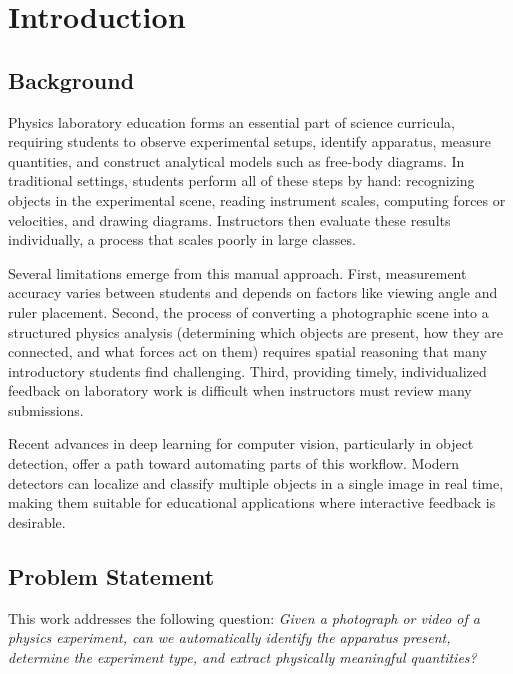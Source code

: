 \documentclass[12pt]{article}
\begin{document}
\newpage
\section{Introduction}

\subsection{Background}

Physics laboratory education forms an essential part of science curricula, requiring students to observe experimental setups, identify apparatus, measure quantities, and construct analytical models such as free-body diagrams. In traditional settings, students perform all of these steps by hand: recognizing objects in the experimental scene, reading instrument scales, computing forces or velocities, and drawing diagrams. Instructors then evaluate these results individually, a process that scales poorly in large classes.

Several limitations emerge from this manual approach. First, measurement accuracy varies between students and depends on factors like viewing angle and ruler placement. Second, the process of converting a photographic scene into a structured physics analysis (determining which objects are present, how they are connected, and what forces act on them) requires spatial reasoning that many introductory students find challenging. Third, providing timely, individualized feedback on laboratory work is difficult when instructors must review many submissions.

Recent advances in deep learning for computer vision, particularly in object detection, offer a path toward automating parts of this workflow. Modern detectors can localize and classify multiple objects in a single image in real time, making them suitable for educational applications where interactive feedback is desirable.

\subsection{Problem Statement}

This work addresses the following question: \textit{Given a photograph or video of a physics experiment, can we automatically identify the apparatus present, determine the experiment type, and extract physically meaningful quantities?}
\end{document}
